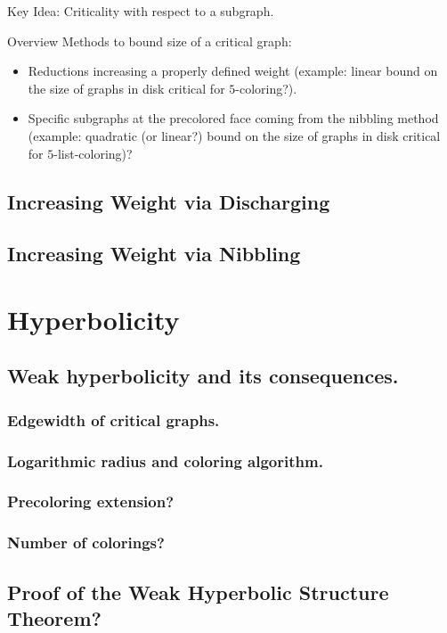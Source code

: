 \documentclass[12pt,twoside,openright,a4paper]{book}
\begin{document}
Key Idea: Criticality with respect to a subgraph.

Overview Methods to bound size of a critical graph:
\begin{itemize}
\item Reductions increasing a properly defined weight (example: linear bound on the size of graphs in disk
critical for $5$-coloring?).
\item Specific subgraphs at the precolored face coming from the nibbling method (example: quadratic (or linear?) bound
on the size of graphs in disk critical for $5$-list-coloring)?
\end{itemize}

\section{Increasing Weight via Discharging}

\section{Increasing Weight via Nibbling}

\chapter{Hyperbolicity}\label{chap:hyper}


\section{Weak hyperbolicity and its consequences.}

\subsection{Edgewidth of critical graphs. }
\subsection{Logarithmic radius and coloring algorithm.}
\subsection{Precoloring extension?}
\subsection{Number of colorings? }

\section{Proof of the Weak Hyperbolic Structure Theorem?}
\end{document}

